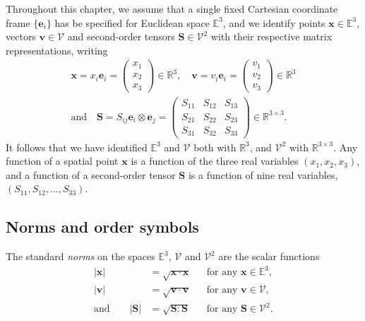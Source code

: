 \documentclass[
  letterpaper,
  DIV=11,
  numbers=noendperiod]{scrreprt}
\theoremstyle{plain}
\theoremstyle{remark}
\begin{document}
Throughout this chapter, we assume that a single fixed Cartesian
coordinate frame \(\{{\boldsymbol{e}}_i\}\) has be specified for
Euclidean space \({\mathbb{E}}^3\), and we identify points
\({\boldsymbol{x}}\in{\mathbb{E}}^3\), vectors
\({\boldsymbol{v}}\in{\mathcal{V}}\) and second-order tensors
\({\boldsymbol{S}}\in{\mathcal{V}}^2\) with their respective matrix
representations, writing \[\begin{gathered}
  {\boldsymbol{x}}= x_i{\boldsymbol{e}}_i = \left(\begin{array}{c} x_1 \\ x_2 \\ x_3 \end{array}\right)\in{\mathbb{R}}^3,\quad
  {\boldsymbol{v}}= v_i{\boldsymbol{e}}_i = \left(\begin{array}{c} v_1 \\ v_2 \\ v_3 \end{array}\right)\in{\mathbb{R}}^3\\
  \text{and}\quad {\boldsymbol{S}}= S_{ij}{\boldsymbol{e}}_i\otimes{\boldsymbol{e}}_j =
  \left(\begin{array}{ccc}
          S_{11} & S_{12} & S_{13} \\
          S_{21} & S_{22} & S_{23} \\
          S_{31} & S_{32} & S_{33}
        \end{array}\right)\in{\mathbb{R}}^{3\times 3}.
\end{gathered}\] It follows that we have identified \({\mathbb{E}}^3\)
and \({\mathcal{V}}\) both with \({\mathbb{R}}^3\), and
\({\mathcal{V}}^2\) with \({\mathbb{R}}^{3\times3}\). Any function of a
spatial point \({\boldsymbol{x}}\) is a function of the three real
variables \((x_1,x_2,x_3)\), and a function of a second-order tensor
\({\boldsymbol{S}}\) is a function of nine real variables,
\((S_{11},S_{12},\dots,S_{33})\).

\subsection{Norms and order symbols}\label{norms-and-order-symbols}

The standard \emph{norms} on the spaces \({\mathbb{E}}^3\),
\({\mathcal{V}}\) and \({\mathcal{V}}^2\) are the scalar functions
\[\begin{aligned}
  |{\boldsymbol{x}}|&=\sqrt{{\boldsymbol{x}}\cdot{\boldsymbol{x}}}&&\text{for any }{\boldsymbol{x}}\in{\mathbb{E}}^3,\\
  |{\boldsymbol{v}}|&=\sqrt{{\boldsymbol{v}}\cdot{\boldsymbol{v}}}&&\text{for any }{\boldsymbol{v}}\in{\mathcal{V}},\\
  \text{and}\qquad|{\boldsymbol{S}}|&=\sqrt{{\boldsymbol{S}}:{\boldsymbol{S}}}&&\text{for any }{\boldsymbol{S}}\in{\mathcal{V}}^2.
\end{aligned}\]
\end{document}
